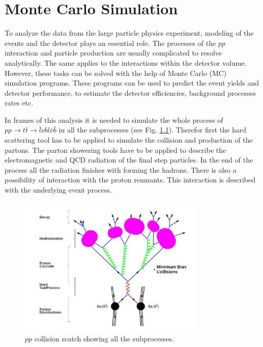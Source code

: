 \chapter{Monte Carlo Simulation}\label{chapt:MC}

To analyze the data from the large particle physics experiment, modeling of the events and the detector
plays an essential role. The processes of the $pp$ interaction and particle production are usually complicated
to resolve analytically. The same applies to the interactions within the detector volume. However, these 
tasks can be solved with the help of Monte Carlo (MC) simulation programs. These programs can be used to predict
the event yields and detector performance, to estimate the detector efficiencies, background processes rates etc.

In frames of this analysis it is needed to simulate the whole process of $pp \rightarrow t\bar{t} \rightarrow \bar{l}\nu bl\bar{\nu}\bar{b}$
in all the subprocesses (see Fig. \ref{fig:pp_all}). Therefor first the hard scattering tool has to be applied to simulate the collision and
production of the partons. The parton showering tools have to be applied to describe the electromagnetic and QCD
radiation of the final step particles. In the end of the process all the radiation finishes with forming the 
hadrons. There is also a possibility of interaction with the proton remnants. This interaction is described with
the underlying event process.

\begin{figure}[t]
  \centering
  \includegraphics[width=0.8\textwidth]{03_simulation/plots/pp_all_proc.pdf}
  \caption{$pp$ collision scatch showing all the subprocesses.}
  \label{fig:pp_all}
\end{figure}

